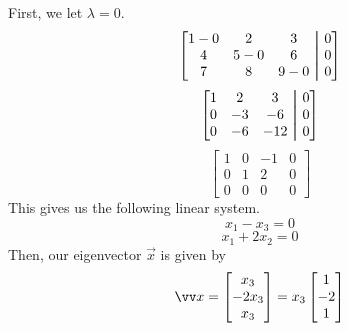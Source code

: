 \documentclass[12pt, letterpaper, twoside]{article}
\newcommand\aug{\fboxsep=-\fboxrule\!\!\!\fbox{\strut}\!\!\!} %
\begin{document}
\begin{enumerate}
First, we let \(\lambda=0\).
\[
\begin{bmatrix}
    1-0&2&3&\aug&0\\
    4&5-0&6&\aug&0\\
    7&8&9-0&\aug&0
\end{bmatrix}
\]
\[
\begin{bmatrix}
    1&2&3&\aug&0\\
    0&-3&-6&\aug&0\\
    0&-6&-12&\aug&0
\end{bmatrix}
\]
\[
\begin{bmatrix}
1&0&-1&0\\
0&1&2&0\\
0&0&0&0
\end{bmatrix}
\]
This gives us the following linear system.
\[x_1-x_3=0\]
\[x_1+2x_2=0\]
Then, our eigenvector \(\vec x\) is given by 
\[\vv x=\begin{bmatrix}
    x_3\\
    -2x_3\\
    x_3\\
\end{bmatrix}=x_3\begin{bmatrix}
    1\\
    -2\\
    1
\end{bmatrix}\] 


\end{enumerate}
\end{document}
